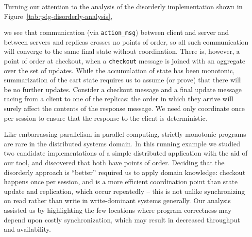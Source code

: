 Turning our attention to the analysis of the disorderly implementation
shown in Figure~\ref{tab:pdg-disorderly-analysis},

we see that communication (via \texttt{action\_msg}) between client and server
and between servers and replicas crosses no points of order, so all such
communication will converge to the same final state without coordination.
There is, however, a point of order at checkout, when a \texttt{checkout}
message is joined with an aggregate over the set of updates.  While the 
accumulation of state has been monotonic, summarization of the cart state
requires us to assume (or prove) that there will be no further updates.
Consider a checkout message and a final update message racing from a client
to one of the replicas: the order in which they arrive will surely affect
the contents of the response message.  
We need only coordinate once per session to
ensure that the response to the client is deterministic.

Like embarrassing parallelism in parallel computing, strictly monotonic programs
are rare in the distributed systems domain.  In this running example we studied
two candidate implementations of a simple distributed application with the aid of
our tool, and discovered that both have points of order.  Deciding that the disorderly
approach is ``better'' required us to apply domain knowledge: checkout happens
once per session, and is a more efficient coordination point than state update and replication, 
which occur repeatedly -- this is not unlike synchronizing on read rather than write 
in write-dominant systems generally.  Our analysis assisted us by highlighting the few locations where program correctness may depend upon costly synchronization, which may
result in decreased throughput and availability.  

